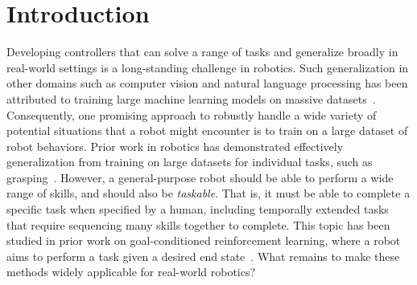 \section{Introduction}

Developing controllers that can solve a range of tasks and generalize broadly in real-world settings is a long-standing challenge in robotics.
Such generalization in other domains such as computer vision and natural language processing has been attributed to training large machine learning models on massive datasets~\cite{krizhevsky2012imagenet}.
Consequently, one promising approach to robustly handle a wide variety of potential situations that a robot might encounter is to train on a large dataset of robot behaviors.
Prior work in robotics has demonstrated effectively generalization from training on large datasets for individual tasks, such as grasping~\cite{levine2017grasping, yu2021conservative}.
However, a general-purpose robot should be able to perform a wide range of skills, and should also be \textit{taskable}.
That is, it must be able to complete a specific task when specified by a human, including temporally extended tasks that require sequencing many skills together to complete.
This topic has been studied in prior work on goal-conditioned reinforcement learning, where a robot aims to perform a task given a desired end state~\cite{Khazatsky2021WhatCI, chebotar2021actionable, kalashnikov2021mtopt}.
What remains to make these methods widely applicable for real-world robotics?

